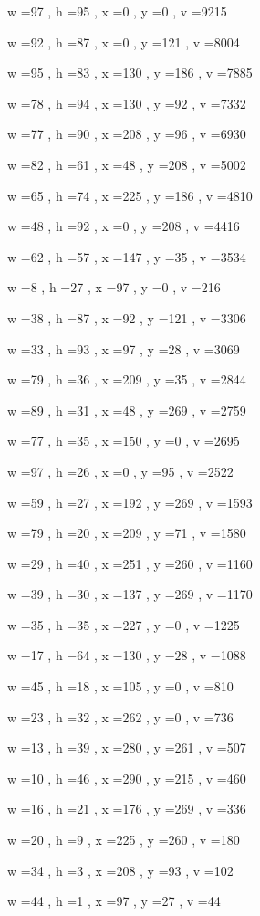 \documentclass[11pt]{article}
\begin{document}
w =97 , h =95 , x =0 , y =0 , v =9215
\par
w =92 , h =87 , x =0 , y =121 , v =8004
\par
w =95 , h =83 , x =130 , y =186 , v =7885
\par
w =78 , h =94 , x =130 , y =92 , v =7332
\par
w =77 , h =90 , x =208 , y =96 , v =6930
\par
w =82 , h =61 , x =48 , y =208 , v =5002
\par
w =65 , h =74 , x =225 , y =186 , v =4810
\par
w =48 , h =92 , x =0 , y =208 , v =4416
\par
w =62 , h =57 , x =147 , y =35 , v =3534
\par
w =8 , h =27 , x =97 , y =0 , v =216
\par
w =38 , h =87 , x =92 , y =121 , v =3306
\par
w =33 , h =93 , x =97 , y =28 , v =3069
\par
w =79 , h =36 , x =209 , y =35 , v =2844
\par
w =89 , h =31 , x =48 , y =269 , v =2759
\par
w =77 , h =35 , x =150 , y =0 , v =2695
\par
w =97 , h =26 , x =0 , y =95 , v =2522
\par
w =59 , h =27 , x =192 , y =269 , v =1593
\par
w =79 , h =20 , x =209 , y =71 , v =1580
\par
w =29 , h =40 , x =251 , y =260 , v =1160
\par
w =39 , h =30 , x =137 , y =269 , v =1170
\par
w =35 , h =35 , x =227 , y =0 , v =1225
\par
w =17 , h =64 , x =130 , y =28 , v =1088
\par
w =45 , h =18 , x =105 , y =0 , v =810
\par
w =23 , h =32 , x =262 , y =0 , v =736
\par
w =13 , h =39 , x =280 , y =261 , v =507
\par
w =10 , h =46 , x =290 , y =215 , v =460
\par
w =16 , h =21 , x =176 , y =269 , v =336
\par
w =20 , h =9 , x =225 , y =260 , v =180
\par
w =34 , h =3 , x =208 , y =93 , v =102
\par
w =44 , h =1 , x =97 , y =27 , v =44
\par
\newpage
\end{document}
